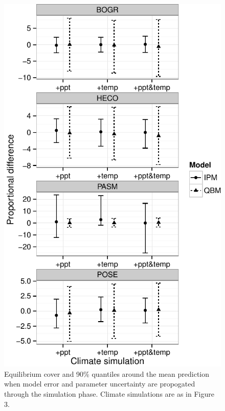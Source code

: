 \documentclass[12pt,]{article}
\begin{document}
\begin{figure}[htbp]
\centering
\includegraphics{components/figure/manuscript-figure_4.pdf}
\caption{Equilibrium cover and 90\% quantiles around the mean prediction
when model error and parameter uncertainty are propogated through the
simulation phase. Climate simulations are as in Figure 3.}
\end{figure}
\end{document}
